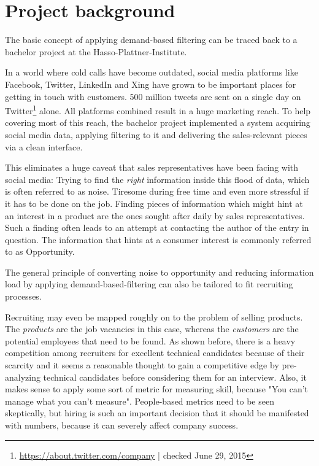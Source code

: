 \section{Project background}
The basic concept of applying demand-based filtering can be traced back to a bachelor project at the Hasso-Plattner-Institute.


In a world where cold calls have become outdated\cite{bh:2014}, social media platforms like Facebook, Twitter, LinkedIn and Xing have grown to be important places for getting in touch with customers. 500 million tweets are sent on a single day on Twitter\footnote{\url{https://about.twitter.com/company} | checked June 29, 2015} alone. All platforms combined result in a huge marketing reach. To help covering most of this reach, the bachelor project implemented a system acquiring social media data, applying filtering to it and delivering the sales-relevant pieces via a clean interface.

This eliminates a huge caveat that sales representatives have been facing with social media: Trying to find the \textit{right} information inside this flood of data, which is often referred to as noise. Tiresome during free time and even more stressful if it has to be done on the job. Finding pieces of information which might hint at an interest in a product are the ones sought after daily by sales representatives. Such a finding often leads to an attempt at contacting the author of the entry in question. The information that hints at a consumer interest is commonly referred to as Opportunity.
\newline


The general principle of converting noise to opportunity and reducing information load by applying demand-based-filtering can also be tailored to fit recruiting processes.


Recruiting may even be mapped roughly on to the problem of selling  products. The \textit{products} are the job vacancies in this case, whereas the \textit{customers} are the potential employees that need to be found. As shown before, there is a heavy competition among recruiters for excellent technical candidates because of their scarcity and it seems a reasonable thought to gain a competitive edge by pre-analyzing technical candidates before considering them for an interview. Also, it makes sense to apply some sort of metric for measuring skill, because
"You can't manage what you can't measure"\cite{tdm:1986}.  People-based metrics need to be seen skeptically, but hiring is such an important decision that it should be manifested with numbers, because it can severely affect company success\cite{hk:1998}.